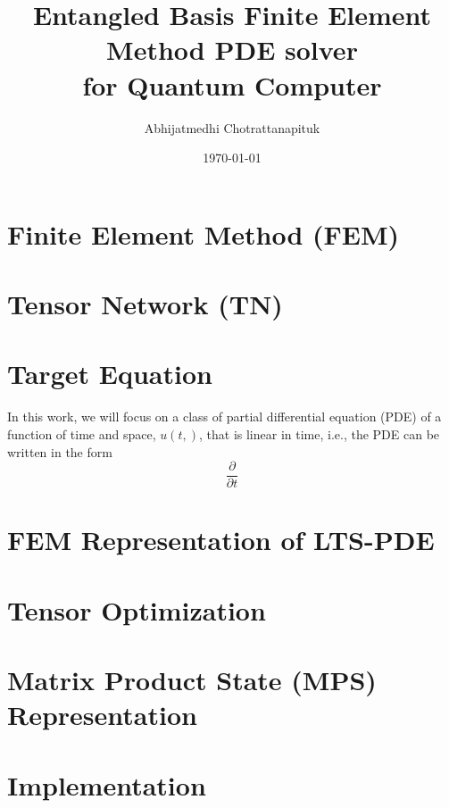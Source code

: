 \documentclass[preprint, 12pt]{revtex4-2}
\numberwithin{equation}{section}
\begin{document}
\title{Entangled Basis Finite Element Method PDE solver\\for Quantum Computer}

\author{Abhijatmedhi Chotrattanapituk}

\date{\today}

\maketitle
\section{Finite Element Method (FEM)}
\section{Tensor Network (TN)}
\section{Target Equation}
In this work, we will focus on a class of partial differential equation (PDE) of a function of time and space, $u(t, )$, that is linear in time, i.e., the PDE can be written in the form
\begin{equation}
    \dfrac{\partial}{\partial t}
\end{equation}
\section{FEM Representation of LTS-PDE}
\section{Tensor Optimization}
\section{Matrix Product State (MPS) Representation}
\section{Implementation}
\end{document}
